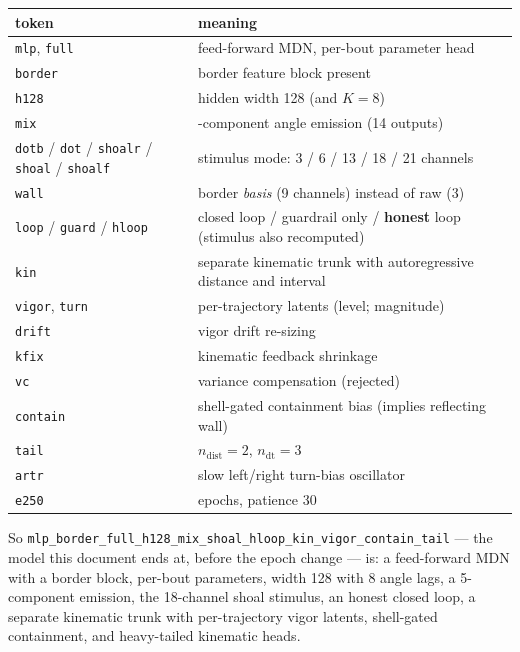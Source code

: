 \documentclass[11pt,a4paper]{article}
\newcommand{\code}[1]{\texttt{\small #1}}
\begin{document}
\begin{center}\small
\begin{tabular}{@{}>{\raggedright\arraybackslash}p{}
                  >{\raggedright\arraybackslash}p{}@{}}
\toprule
\textbf{token} & \textbf{meaning} \\
\midrule
\code{mlp}, \code{full} & feed-forward MDN, per-bout parameter head \\
\code{border} & border feature block present \\
\code{h128} & hidden width 128 (and $K = 8$) \\
\code{mix} & 5-component angle emission (14 outputs) \\
\code{dotb} / \code{dot} / \code{shoalr} / \code{shoal} / \code{shoalf} & stimulus mode: 3 / 6 / 13 / 18 / 21 channels \\
\code{wall} & border \emph{basis} (9 channels) instead of raw (3) \\
\code{loop} / \code{guard} / \code{hloop} & closed loop / guardrail only / \textbf{honest} loop (stimulus also recomputed) \\
\code{kin} & separate kinematic trunk with autoregressive distance and interval \\
\code{vigor}, \code{turn} & per-trajectory latents (level; magnitude) \\
\code{drift} & vigor drift re-sizing \\
\code{kfix} & kinematic feedback shrinkage \\
\code{vc} & variance compensation (rejected) \\
\code{contain} & shell-gated containment bias (implies reflecting wall) \\
\code{tail} & $n_{\mathrm{dist}} = 2$, $n_{\mathrm{dt}} = 3$ \\
\code{artr} & slow left/right turn-bias oscillator \\
\code{e250} & 250 epochs, patience 30 \\
\bottomrule
\end{tabular}
\end{center}

So \code{mlp\_border\_full\_h128\_mix\_shoal\_hloop\_kin\_vigor\_contain\_tail} --- the
model this document ends at, before the epoch change --- is: a feed-forward MDN with a
border block, per-bout parameters, width 128 with 8 angle lags, a 5-component emission,
the 18-channel shoal stimulus, an honest closed loop, a separate kinematic trunk with
per-trajectory vigor latents, shell-gated containment, and heavy-tailed kinematic heads.
\end{document}
